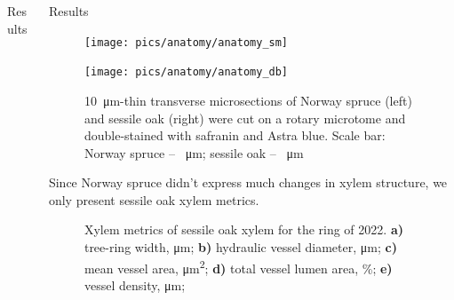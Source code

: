 \documentclass[final]{beamer}
\newlength{\sepwidth}
\newlength{\colwidth}
\newcommand{\separatorcolumn}{\begin{column}{\sepwidth}\end{column}}
\begin{document}
\begin{frame}[t]
\begin{columns}[t]
\begin{column}{\colwidth}
\begin{block}{Results}
        \begin{figure}
            \caption{}
            \label{fig:sap}
        \end{figure}
\end{block}

\end{column}


\begin{column}{\colwidth}

\begin{block}{Results}
        \begin{figure}
            \begin{minipage}{0.45\textwidth}
                \centering \texttt{[image: pics/anatomy/anatomy\_sm]}
                \label{fig:anatomy_sm}
            \end{minipage}\hfill
            \begin{minipage}{0.45\textwidth}
                \centering \texttt{[image: pics/anatomy/anatomy\_db]}
                \label{fig:anatomy_db}
            \end{minipage}\hfill
            \caption{\SI{10}{\micro\meter}-thin transverse microsections of Norway spruce (left) and sessile oak (right) were cut on a rotary microtome and double-stained with safranin and Astra blue. Scale bar: Norway spruce -- \SI{}{\micro\meter}; sessile oak -- \SI{}{\micro\meter}}
        \end{figure}
\end{block}
    Since Norway spruce didn't express much changes in xylem structure, we only present sessile oak xylem metrics.
        \begin{figure}
            
            \caption{
                Xylem metrics of sessile oak xylem for the ring of 2022. 
                \textbf{a)} tree-ring width, \si{\micro\meter};
                \textbf{b)} hydraulic vessel diameter, \si{\micro\meter};
                \textbf{c)} mean vessel area, \si{\micro\meter\squared};
                \textbf{d)} total vessel lumen area, \%;
                \textbf{e)} vessel density, \si{\micro\meter};
}
\end{figure}
\end{column}
\end{columns}
\end{frame}
\end{document}

